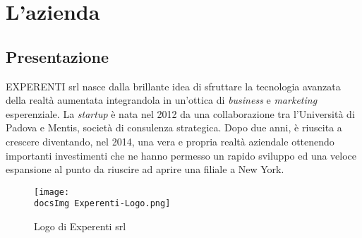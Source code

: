 \section{L'azienda}
\subsection{Presentazione}
EXPERENTI srl nasce dalla brillante idea di sfruttare la tecnologia avanzata della realt\`a aumentata integrandola in un'ottica di \textit{business\gloss} e \textit{marketing} esperenziale.
La \textit{startup} \`e nata nel 2012 da una collaborazione tra l’Università di Padova e Mentis, società di consulenza strategica. Dopo due anni, \`e riuscita a crescere diventando, nel 2014, una vera e propria realt\`a aziendale ottenendo importanti investimenti che ne hanno permesso un rapido sviluppo ed una veloce espansione al punto da riuscire ad aprire una filiale a New York.

\begin{figure}[H]
	\centering
	\texttt{[image: \\docsImg Experenti-Logo.png]}
	\caption{Logo di Experenti srl}
	\label{fig:Logo di Experenti srl}
\end{figure}

